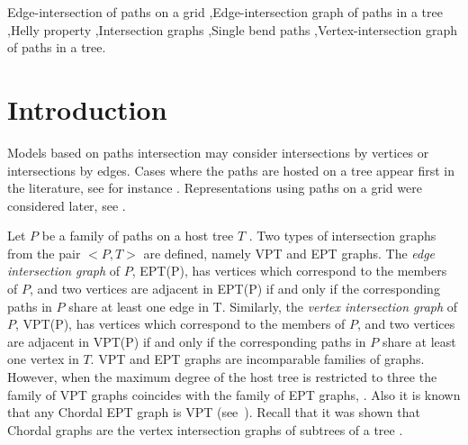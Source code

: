 \documentclass[9pt]{entcs}
\begin{document}
\begin{frontmatter}
\begin{keyword}
Edge-intersection of paths on a grid \sep Edge-intersection graph of paths in a tree  \sep Helly property \sep Intersection graphs \sep Single bend paths \sep Vertex-intersection graph of paths in a tree.
\end{keyword} 



\end{frontmatter}


\section{Introduction}

Models based on paths intersection  may consider  intersections by vertices or   intersections by edges.  Cases where the paths are hosted on a tree  appear first in the literature, see for instance \cite{gavril1978recognition, golumbic1985edge, golumbic1985}.  Representations using paths on a grid were considered later, see  \cite{golumbic2009,golumbic2013, golumbic2013intersection}. %

 Let $P$ be a family of paths on a host tree $T$ . Two types of intersection graphs from the pair $<P,T>$ are defined, namely VPT and EPT graphs.
The \textit{edge intersection graph} of $P$, EPT(P), has vertices which correspond to the members of $P$, and two vertices are adjacent in EPT(P) if and only if the corresponding paths in $P$ share at least one edge in T. Similarly, the \textit{vertex intersection graph} of $P$, VPT(P), has vertices which correspond to the members of $P$, and two vertices are adjacent in VPT(P) if and only if the corresponding paths in $P$ share at least one vertex in $T$.
%
VPT and EPT graphs are incomparable families of graphs. However, when the maximum degree of the host tree is restricted to three the family of
VPT graphs coincides with the family of EPT graphs, \cite{golumbic1985edge%
}. Also it is known that any Chordal EPT graph is VPT (see~\cite{syslo1985triangulated}). Recall that it was shown that Chordal graphs are the vertex intersection graphs of subtrees of a tree \cite{gavril1974intersection}.
\end{document}
